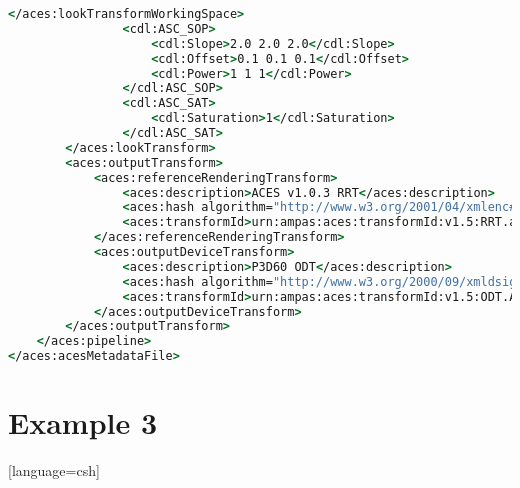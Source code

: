 \begin{lstlisting}[language=csh]
                </aces:lookTransformWorkingSpace>
                <cdl:ASC_SOP>
                    <cdl:Slope>2.0 2.0 2.0</cdl:Slope>
                    <cdl:Offset>0.1 0.1 0.1</cdl:Offset>
                    <cdl:Power>1 1 1</cdl:Power>
                </cdl:ASC_SOP>
                <cdl:ASC_SAT>
                    <cdl:Saturation>1</cdl:Saturation>
                </cdl:ASC_SAT>
        </aces:lookTransform>
        <aces:outputTransform>
            <aces:referenceRenderingTransform>
                <aces:description>ACES v1.0.3 RRT</aces:description>
                <aces:hash algorithm="http://www.w3.org/2001/04/xmlenc#sha256">c81af4fb4a22ee0353308e4582708951df4682bf73f838c24bf44e585fc3bb61</aces:hash>
                <aces:transformId>urn:ampas:aces:transformId:v1.5:RRT.a1.0.3</aces:transformId>
            </aces:referenceRenderingTransform>
            <aces:outputDeviceTransform>
                <aces:description>P3D60 ODT</aces:description>
                <aces:hash algorithm="http://www.w3.org/2000/09/xmldsig#sha1">efd279a82c2d52ee8c49dc0793499dc86bb1a4a3fa0dfb420d59c2814c55aea6</aces:hash>
                <aces:transformId>urn:ampas:aces:transformId:v1.5:ODT.Academy.P3D60_48nits.a1.0.3</aces:transformId>
            </aces:outputDeviceTransform>
        </aces:outputTransform>
    </aces:pipeline>
</aces:acesMetadataFile>
\end{lstlisting}

\newpage
\section*{Example 3}[language=csh]

